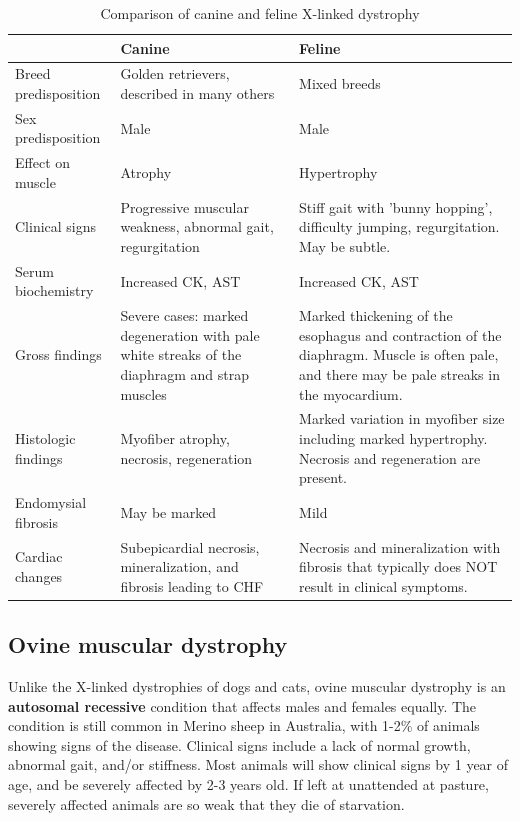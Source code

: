 \documentclass[openany]{book}
\begin{document}
\begin{table}[t]

\caption{\label{tab:dystrophy-table}Comparison of canine and feline X-linked dystrophy}
\centering
\begin{tabular}{l>{\raggedright\arraybackslash}p{15em}>{\raggedright\arraybackslash}p{15em}}
\toprule
  & Canine & Feline\\
\midrule
Breed predisposition & Golden retrievers, described in many others & Mixed breeds\\
Sex predisposition & Male & Male\\
Effect on muscle & Atrophy & Hypertrophy\\
Clinical signs & Progressive muscular weakness, abnormal gait, regurgitation & Stiff gait with 'bunny hopping', difficulty jumping, regurgitation. May be subtle.\\
Serum biochemistry & Increased CK, AST & Increased CK, AST\\
\addlinespace
Gross findings & Severe cases: marked degeneration with pale white streaks of the diaphragm and strap muscles & Marked thickening of the esophagus and contraction of the diaphragm. Muscle is often pale, and there may be pale streaks in the myocardium.\\
Histologic findings & Myofiber atrophy, necrosis, regeneration & Marked variation in myofiber size including marked hypertrophy. Necrosis and regeneration are present.\\
Endomysial fibrosis & May be marked & Mild\\
Cardiac changes & Subepicardial necrosis, mineralization, and fibrosis leading to CHF & Necrosis and mineralization with fibrosis that typically does NOT result in clinical symptoms.\\
\bottomrule
\end{tabular}
\end{table}

\subsection{Ovine muscular dystrophy}\label{ovine-muscular-dystrophy}

Unlike the X-linked dystrophies of dogs and cats, ovine muscular
dystrophy is an \textbf{autosomal recessive} condition that affects
males and females equally. The condition is still common in Merino sheep
in Australia, with 1-2\% of animals showing signs of the disease.
Clinical signs include a lack of normal growth, abnormal gait, and/or
stiffness. Most animals will show clinical signs by 1 year of age, and
be severely affected by 2-3 years old. If left at unattended at pasture,
severely affected animals are so weak that they die of starvation.
\end{document}

